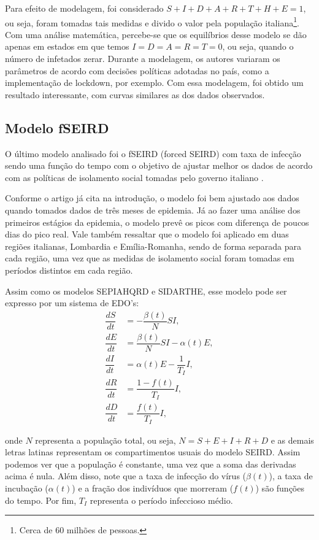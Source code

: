 \documentclass{article}
\begin{document}
	Para efeito de modelagem, foi considerado $S + I + D + A + R + T + H + E = 1$, ou seja, foram tomadas tais medidas e divido o valor pela população italiana\footnote{Cerca de 60 milhões de pessoas.}. Com uma análise matemática, percebe-se que os equilíbrios desse modelo se dão apenas em estados em que temos $I = D = A = R = T = 0$, ou seja, quando o número de infetados zerar. Durante a modelagem, os autores variaram os parâmetros de acordo com decisões políticas adotadas no país, como a implementação de lockdown, por exemplo. Com essa modelagem, foi obtido um resultado interessante, com curvas similares as dos dados observados.
	
	\subsection{Modelo fSEIRD}
	
	O último modelo analisado foi o fSEIRD (forced SEIRD) com taxa de infecção sendo uma função do tempo com o objetivo de ajustar melhor os dados de acordo com as políticas de isolamento social tomadas pelo governo italiano \cite{piccolomini}.
	
	Conforme o artigo já cita na introdução, o modelo foi bem ajustado aos dados quando tomados dados de três meses de epidemia. Já ao fazer uma análise dos primeiros estágios da epidemia, o modelo prevê os picos com diferença de poucos dias do pico real. Vale também ressaltar que o modelo foi aplicado em duas regiões italianas, Lombardia e Emília-Romanha, sendo de forma separada para cada região, uma vez que as medidas de isolamento social foram tomadas em períodos distintos em cada região.
	
	Assim como os modelos SEPIAHQRD e SIDARTHE, esse modelo pode ser expresso por um sistema de EDO's:
	\begin{equation}
	\label{piccolomini_model}
	\begin{split}
	\dfrac{dS}{dt} & = -\dfrac{\beta(t)}{N}SI, \\
	\dfrac{dE}{dt} & = \dfrac{\beta(t)}{N}SI - \alpha(t) E, \\
	\dfrac{dI}{dt} & = \alpha(t) E - \dfrac{1}{T_I}I, \\
	\dfrac{dR}{dt} & = \dfrac{1 - f(t)}{T_I}I, \\
	\dfrac{dD}{dt} & = \dfrac{f(t)}{T_I}I,
	\end{split}
	\end{equation}
	
	\noindent onde $N$ representa a população total, ou seja, $N = S + E + I + R + D$ e as demais letras latinas representam os compartimentos usuais do modelo SEIRD. Assim podemos ver que a população é constante, uma vez que a soma das derivadas acima é nula. Além disso, note que a taxa de infecção do vírus ($\beta(t)$), a taxa de incubação ($\alpha(t)$) e a fração dos indivíduos que morreram ($f(t)$) são funções do tempo. Por fim, $T_I$ representa o período infeccioso médio.
	
\end{document}
